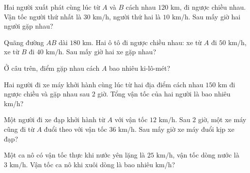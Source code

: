 
\begin{ex}
  Hai người xuất phát cùng lúc từ $A$ và $B$ cách nhau $120\text{ km}$, đi ngược chiều nhau. Vận tốc người thứ nhất là $30\text{ km/h}$, người thứ hai là $10\text{ km/h}$. Sau mấy giờ hai người gặp nhau?
\end{ex}

\begin{ex}
  Quãng đường $AB$ dài $180\text{ km}$. Hai ô tô đi ngược chiều nhau: xe từ $A$ đi $50\text{ km/h}$, xe từ $B$ đi $40\text{ km/h}$. Sau mấy giờ hai xe gặp nhau?
\end{ex}

\begin{ex}
  Ở câu trên, điểm gặp nhau cách $A$ bao nhiêu ki-lô-mét?
\end{ex}

\begin{ex}
  Hai người đi xe máy khởi hành cùng lúc từ hai địa điểm cách nhau $150\text{ km}$ đi ngược chiều và gặp nhau sau $2$ giờ. Tổng vận tốc của hai người là bao nhiêu km/h?
\end{ex}

\begin{ex}
  Một người đi xe đạp khởi hành từ $A$ với vận tốc $12\text{ km/h}$. Sau $2$ giờ, một xe máy cũng đi từ $A$ đuổi theo với vận tốc $36\text{ km/h}$. Sau mấy giờ xe máy đuổi kịp xe đạp?
\end{ex}

\begin{ex}
  Một ca nô có vận tốc thực khi nước yên lặng là $25\text{ km/h}$, vận tốc dòng nước là $3\text{ km/h}$. Vận tốc ca nô khi xuôi dòng là bao nhiêu km/h?
\end{ex}

